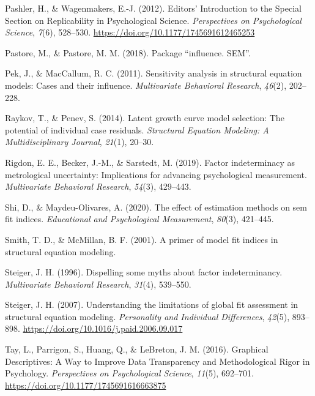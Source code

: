 \documentclass[
  english,
  doc]{apa6}
\newlength{\cslhangindent}
\newenvironment{cslreferences}%
  {\setlength{\parindent}{0pt}%
  \everypar{\setlength{\hangindent}{\cslhangindent}}\ignorespaces}%
  {\par}
\begin{document}
\begin{cslreferences}
\leavevmode\hypertarget{ref-Pashler2012a}{}%
Pashler, H., \& Wagenmakers, E.-J. (2012). Editors' Introduction to the Special Section on Replicability in Psychological Science. \emph{Perspectives on Psychological Science}, \emph{7}(6), 528--530. \url{https://doi.org/10.1177/1745691612465253}

\leavevmode\hypertarget{ref-pastore2018package}{}%
Pastore, M., \& Pastore, M. M. (2018). Package ``influence. SEM''.

\leavevmode\hypertarget{ref-pek2011sensitivity}{}%
Pek, J., \& MacCallum, R. C. (2011). Sensitivity analysis in structural equation models: Cases and their influence. \emph{Multivariate Behavioral Research}, \emph{46}(2), 202--228.

\leavevmode\hypertarget{ref-raykov2014latent}{}%
Raykov, T., \& Penev, S. (2014). Latent growth curve model selection: The potential of individual case residuals. \emph{Structural Equation Modeling: A Multidisciplinary Journal}, \emph{21}(1), 20--30.

\leavevmode\hypertarget{ref-rigdon2019factor}{}%
Rigdon, E. E., Becker, J.-M., \& Sarstedt, M. (2019). Factor indeterminacy as metrological uncertainty: Implications for advancing psychological measurement. \emph{Multivariate Behavioral Research}, \emph{54}(3), 429--443.

\leavevmode\hypertarget{ref-shi2020effect}{}%
Shi, D., \& Maydeu-Olivares, A. (2020). The effect of estimation methods on sem fit indices. \emph{Educational and Psychological Measurement}, \emph{80}(3), 421--445.

\leavevmode\hypertarget{ref-smith2001primer}{}%
Smith, T. D., \& McMillan, B. F. (2001). A primer of model fit indices in structural equation modeling.

\leavevmode\hypertarget{ref-steiger1996dispelling}{}%
Steiger, J. H. (1996). Dispelling some myths about factor indeterminancy. \emph{Multivariate Behavioral Research}, \emph{31}(4), 539--550.

\leavevmode\hypertarget{ref-Steiger2007}{}%
Steiger, J. H. (2007). Understanding the limitations of global fit assessment in structural equation modeling. \emph{Personality and Individual Differences}, \emph{42}(5), 893--898. \url{https://doi.org/10.1016/j.paid.2006.09.017}

\leavevmode\hypertarget{ref-Tay2016a}{}%
Tay, L., Parrigon, S., Huang, Q., \& LeBreton, J. M. (2016). Graphical Descriptives: A Way to Improve Data Transparency and Methodological Rigor in Psychology. \emph{Perspectives on Psychological Science}, \emph{11}(5), 692--701. \url{https://doi.org/10.1177/1745691616663875}


\end{cslreferences}
\end{document}
